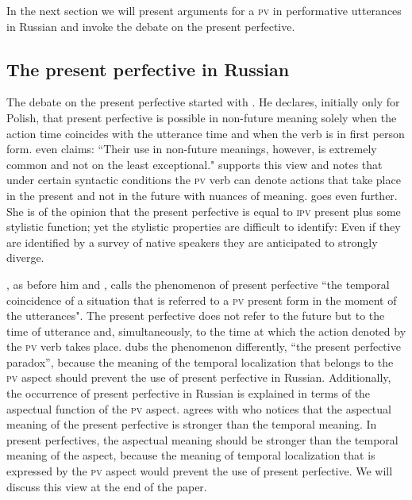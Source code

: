 \documentclass[output=paper,
colorlinks,
citecolor=brown,
newtxmath,
hidelinks
]{langscibook}
\begin{document}
In the next section we will present arguments for a \textsc{pv} in performative utterances in Russian and invoke the debate on the present perfective.

\subsection{The present perfective in Russian}\label{sub:eins:4}

The debate on the present perfective started with \citet{Koschmieder1929}. He declares, initially only for Polish, that present perfective is possible in non-future meaning solely when the action time coincides with the utterance time and when the verb is in first person form. \citet[120]{Forsyth1970} even claims: “Their use in non-future meanings, however, is extremely common and not on the least exceptional." \citet{Svedova1980} supports this view and notes that under certain syntactic conditions the \textsc{pv} verb can denote actions that take place in the present and not in the future with nuances of meaning. \citet{Rathmayr1976} goes even further. She is of the opinion that the present perfective is equal to \textsc{ipv} present plus some stylistic function; yet the stylistic properties are difficult to identify: Even if they are identified by a survey of native speakers they are anticipated to strongly diverge. 

\citet{Dickey2000}, as before him \citet{Bondarko1971} and \citet{Galton1976}, calls the phenomenon of present perfective “the temporal coincidence of a situation that is referred to a \textsc{pv} present form in the moment of the utterances". The present perfective does not refer to the future but to the time of utterance and, simultaneously, to the time at which the action denoted by the \textsc{pv} verb takes place. \citet{Dewit2017} dubs the phenomenon differently, “the present perfective paradox”, because the meaning of the temporal localization that belongs to the \textsc{pv} aspect should prevent the use of present perfective in Russian. Additionally, the occurrence of present perfective in Russian is explained in terms of the aspectual function of the \textsc{pv} aspect. \citet{Dewit2017} agrees with \citet{Breu2000} who notices that the aspectual meaning of the present perfective is stronger than the temporal meaning. In present perfectives, the aspectual meaning should be stronger than the temporal meaning of the aspect, because the meaning of temporal localization that is expressed by the \textsc{pv} aspect would prevent the use of present perfective. We will discuss this view at the end of the paper. 
\end{document}
